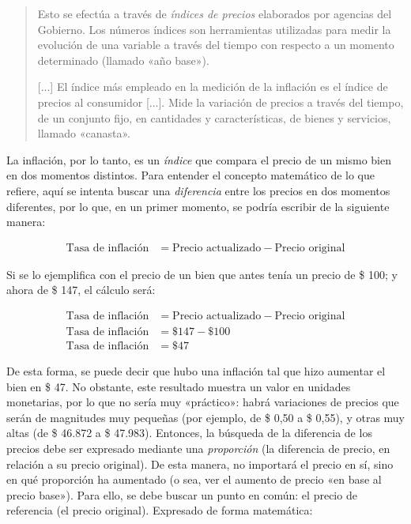 \documentclass[12pt,a4paper,twoside]{book}
\begin{document}
\begin{quotation}
Esto se efectúa a través de \textit{índices de precios} elaborados por agencias del Gobierno. Los números índices son herramientas utilizadas para medir la evolución de una variable a través del tiempo con respecto a un momento determinado (llamado «año base»).

[...] El índice más empleado en la medición de la inflación es el índice de precios al consumidor [...]. Mide la variación de precios a través del tiempo, de un conjunto fijo, en cantidades y características, de bienes y servicios, llamado «canasta». \cite[págs. 55-56]{nappa:calc-financ}
\end{quotation}

La inflación, por lo tanto, es un \textit{índice} que compara el precio de un mismo bien en dos momentos distintos. Para entender el concepto matemático de lo que refiere, aquí se intenta buscar una \textit{diferencia} entre los precios en dos momentos diferentes, por lo que, en un primer momento, se podría escribir de la siguiente manera:

\begin{align*}
\text{Tasa de inflación} &= \text{Precio actualizado} - \text{Precio original}
\end{align*}

Si se lo ejemplifica con el precio de un bien que antes tenía un precio de \$ 100; y ahora de \$ 147, el cálculo será:

\begin{align*}
\text{Tasa de inflación} &= \text{Precio actualizado} - \text{Precio original} \\
\text{Tasa de inflación} &= \text{\$ } 147 - \text{\$ } 100 \\
\text{Tasa de inflación} &= \text{\$ } 47
\end{align*}

De esta forma, se puede decir que hubo una inflación tal que hizo aumentar el bien en \$ 47. No obstante, este resultado muestra un valor en unidades monetarias, por lo que no sería muy «práctico»: habrá variaciones de precios que serán de magnitudes muy pequeñas (por ejemplo, de \$ 0,50 a \$ 0,55), y otras muy altas (de \$ 46.872 a \$ 47.983). Entonces, la búsqueda de la diferencia de los precios debe ser expresado mediante una \textit{proporción} (la diferencia de precio, en relación a su precio original). De esta manera, no importará el precio en sí, sino en qué proporción ha aumentado (o sea, ver el aumento de precio «en base al precio base»). Para ello, se debe buscar un punto en común: el precio de referencia (el precio original). Expresado de forma matemática:
\end{document}
